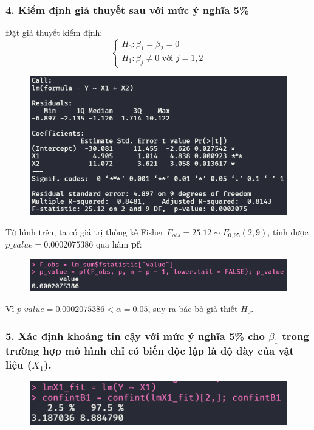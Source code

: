 \documentclass[a4paper]{article}
\theoremstyle{nonumberplain}
\begin{document}
\subsubsection*{4. Kiểm định giả thuyết sau với mức ý nghĩa 5\%}
Đặt giả thuyết kiểm định:
\[\begin{cases}
	H_0 : \beta_1 = \beta_2 = 0 \\
	H_1: \beta_j \neq 0 \text{ với } j=1,2 
\end{cases}\]

\begin{figure}[h!]
	\centering
	\includegraphics[width=0.7\linewidth]{bai-2-4-summary}
	\label{fig:bai-2-4-summary}
\end{figure}

Từ hình trên, ta có giá trị thống kê Fisher $F_{obs} = 25.12 \sim F_{0,95}(2,9)$, tính được $p\_value = 0.0002075386$ qua hàm \textbf{pf}:
\begin{figure}[h!]
	\centering
	\includegraphics[width=0.7\linewidth]{bai-2-4-p_value}
	\label{fig:bai-2-4-pvalue}
\end{figure}

Vì $p\_value = 0.0002075386 < \alpha = 0.05$, suy ra bác bỏ giả thiết $H_0$.

\subsubsection*{5. Xác định khoảng tin cậy với mức ý nghĩa 5\% cho $\beta_1$ trong trường hợp mô hình chỉ có biến độc lập là độ dày của vật liệu ($X_1$).}

\begin{figure}[h!]
	\centering
	\includegraphics[width=0.7\linewidth]{bai-2-5-confint-beta1}
	\label{fig:bai-2-5-confint-beta1}
\end{figure}
\end{document}
